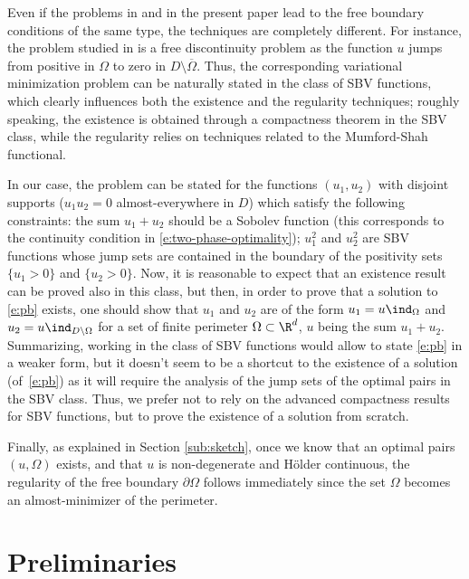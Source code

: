 Even if the problems in \cite{bl,ck} and in the present paper lead to the free boundary conditions of the same type, the techniques are completely different. For instance, the problem studied in \cite{bl,ck} is a free discontinuity problem as the function $u$ jumps from positive in $\Omega$ to zero in $D\setminus \overline\Omega$. Thus, the corresponding variational minimization problem can be naturally stated in the class of SBV functions, which clearly influences both the existence and the regularity techniques; roughly speaking, the existence is obtained through a compactness theorem in the SBV class, while the regularity relies on techniques related to the Mumford-Shah functional.

In our case, the problem can be stated for the functions $(u_1,u_2)$ with disjoint supports ($u_1u_2=0$ almost-everywhere in $D$) which satisfy the following constraints: the sum $u_1+u_2$ should be a Sobolev function (this corresponds to the continuity condition in \eqref{e:two-phase-optimality}); $u_1^2$ and $u_2^2$ are SBV functions whose jump sets are contained in the boundary of the positivity sets $\{u_1>0\}$ and $\{u_2>0\}$. Now, it is reasonable to expect that an existence result can be proved also in this class, but then, in order to prove that a solution to \eqref{e:pb} exists, one should show that $u_1$ and $u_2$ are of the form $u_1=u\ind_{\Omega}$ and $u_2=u\ind_{D\setminus \Omega}$ for a set of finite perimeter $\Omega\subset\R^d$, $u$ being the sum $u_1+u_2$. Summarizing, working in the class of SBV functions would allow to state \eqref{e:pb} in a weaker form, but it doesn't seem to be a shortcut to the existence of a solution (of~\eqref{e:pb}) as it will require the analysis of the jump sets of the optimal pairs in the SBV class.
Thus, we prefer not to rely on the advanced compactness results for SBV functions, but to prove the existence of a solution from scratch.

Finally, as explained in Section \ref{sub:sketch}, once we know that an optimal pairs $(u,\Omega)$ exists, and that $u$ is non-degenerate and Hölder continuous, the regularity of the free boundary $\partial\Omega$ follows immediately since the set $\Omega$ becomes an almost-minimizer of the perimeter.

\section{Preliminaries}\label{s:prelimiaries}
